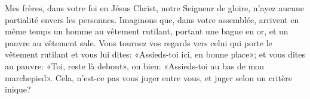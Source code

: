 Mes frères, dans votre foi en Jésus Christ, notre Seigneur de gloire,
	n’ayez aucune partialité envers les personnes.
Imaginons que, dans votre assemblée, arrivent en même temps
	un homme au vêtement rutilant, portant une bague en or,
	et un pauvre au vêtement sale.
Vous tournez vos regards vers celui qui porte le vêtement rutilant
	et vous lui dites: «Assieds-toi ici, en bonne place»;
	et vous dites au pauvre: «Toi, reste là debout»,
	ou bien: «Assieds-toi au bas de mon marchepied».
Cela, n’est-ce pas vous juger entre vous,
	et juger selon un critère inique?
